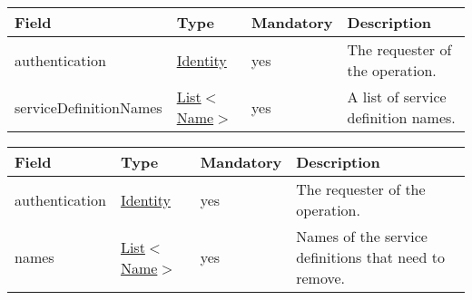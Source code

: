 \documentclass[a4paper]{arrowhead}
\newcommand{\pref}[1]{{\textcolor{ArrowheadGrey}{\hyperref[sec:model:primitives:#1]{#1}}}}
\begin{document}
\label{sec:model:ServiceDefinitionListRequest}
 
\begin{table}[ht!]
\begin{tabularx}{\textwidth}{| p{3.6cm} | p{3cm} | p{2cm} | X |} \hline
\rowcolor{gray!33} Field & Type & Mandatory & Description \\ \hline
authentication & \hyperref[sec:model:Identity]{Identity} & yes & The requester of the operation. \\ \hline
serviceDefinitionNames & \pref{List}$<$\pref{Name}$>$ & yes & A list of service definition names. \\ \hline
\end{tabularx}
\end{table}

\label{sec:model:ServiceDefinitionRemoveRequest}

\begin{table}[ht!]
\begin{tabularx}{\textwidth}{| p{4.1cm} | p{4.8cm} | p{2cm} | X |} \hline
\rowcolor{gray!33} Field & Type & Mandatory & Description \\ \hline
authentication & \hyperref[sec:model:Identity]{Identity} & yes & The requester of the operation. \\ \hline
names &  \pref{List}$<$\pref{Name}$>$ & yes & Names of the service definitions that need to remove. \\ \hline
\end{tabularx}
\end{table}

\label{sec:model:ServiceQueryRequest}
\end{document}
